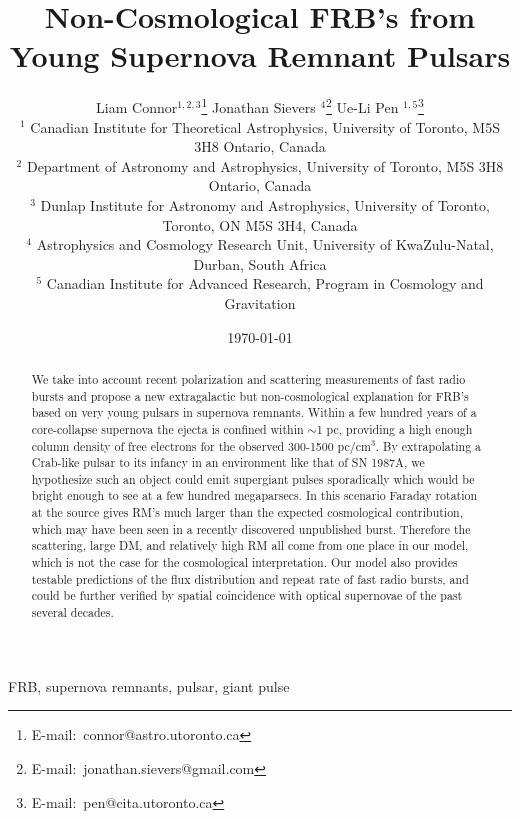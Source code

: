 \documentclass[useAMS,usenatbib]{mn2e}
\title{Non-Cosmological FRB's from Young Supernova Remnant Pulsars}
\author[Connor et al.]{
Liam Connor$^{1,2,3}$\thanks{E-mail:\ connor@astro.utoronto.ca}
Jonathan Sievers $^{4}$\thanks{E-mail:\ jonathan.sievers@gmail.com}
Ue-Li Pen $^{1, 5}$\thanks{E-mail:\ pen@cita.utoronto.ca}
\\
$^1$ Canadian Institute for Theoretical Astrophysics, University of Toronto, M5S 3H8 Ontario, Canada
\\
$^2$ Department of Astronomy and Astrophysics, University of Toronto, 
M5S 3H8 Ontario, Canada
\\
$^3$ Dunlap Institute for Astronomy and Astrophysics, University of Toronto,
Toronto, ON M5S 3H4, Canada
\\
$^4$ Astrophysics and Cosmology Research Unit, University of KwaZulu-Natal, Durban, South Africa
\\
$^5$ Canadian Institute for Advanced Research, Program in Cosmology
and Gravitation
}
\begin{document}
\date{\today}
\pagerange{\pageref{firstpage}--\pageref{lastpage}} 
\maketitle
\label{firstpage}


\begin{abstract}
We take into account recent polarization and scattering measurements of fast radio bursts
and propose a new extragalactic but non-cosmological explanation for FRB's based on
very young pulsars in supernova remnants. Within a few hundred years of a 
core-collapse supernova the ejecta 
is confined within $\sim$1 pc, providing a high enough column density of free electrons 
for the observed 300-1500 pc/cm$^3$. By extrapolating a Crab-like pulsar to 
its infancy in an environment like that of SN 1987A, 
we hypothesize such an object could emit supergiant pulses sporadically which 
would be bright enough to see at a few hundred megaparsecs. In this scenario Faraday
rotation at the source gives RM's much larger than the expected cosmological contribution,
which may have been seen in a recently discovered unpublished burst. Therefore the scattering,
large DM, and relatively high RM all come from one place in our model,
 which is not the case for the cosmological
interpretation. Our model also provides
testable predictions of the flux distribution and repeat rate of fast radio bursts, and could be further
verified by spatial coincidence with optical supernovae of the past several decades. 
\end{abstract}
\begin{keywords}
FRB, supernova remnants, pulsar, giant pulse
\end{keywords}

\end{document}
